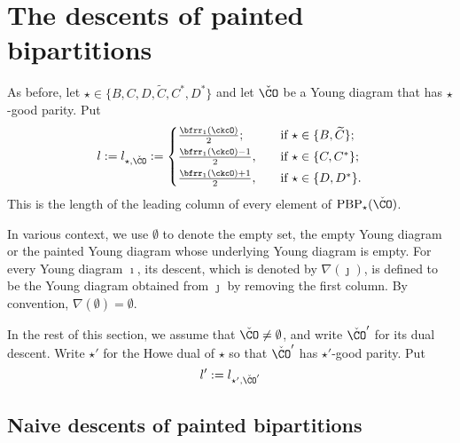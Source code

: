 \documentclass[ssunip]{subfiles}
\begin{document}
 \section{The descents of painted bipartitions}\label{sec:comb}

As before, let  $\star\in \{ B, C,  D, \widetilde{C},  C^*, D^*\}$ and let $\check \CO$ be a Young diagram that has $\star$-good parity. Put
\begin{equation}\label{lstarco}
  l:=l_{\star, \check \CO}:=\begin{cases}
 \frac{\bfrr_1(\ckcO)}{2}; & \quad \textrm{if } \star\in \{B, \widetilde C\};\smallskip\\
 \frac{\bfrr_1(\ckcO)-1}{2}, &\quad \textrm{if } \star\in \{C, C^* \};\smallskip\\
 \frac{\bfrr_1(\ckcO)+1}{2}, &\quad \textrm{if } \star\in \{ D, D^*\}.\\
\end{cases}
\end{equation}
This is the length of the leading column of every element of $\mathrm{PBP}_\star(\check \CO)$. 

 
 In various context, we use $\emptyset$ to denote the empty set, the empty Young diagram or the painted Young diagram whose underlying Young diagram is empty. For every Young diagram $\imath$, its descent, which is denoted by $\nabla(\jmath)$, is defined to be the Young diagram obtained from $\jmath$ by removing the first column. By convention, $\nabla(\emptyset)=\emptyset$. 
 
 In the rest of this section, we assume that $\check \CO\neq \emptyset$, and write $\check \CO'$ for its dual descent. Write $\star'$ for the Howe dual of $\star$ so that $\check \CO'$ has $\star'$-good parity. Put
\[
l':=l_{\star', \check \CO'}
\]
    
 \subsection{Naive descents of painted bipartitions }
\def\bipartl{\mathrm{bi\cP_L}}
\def\bipartr{\mathrm{bi\cP_R}}
\def\dsdiagl{\mathrm{DS_L}}
\def\dsdiagr{\mathrm{DS_R}}
\def\DDl{\eDD_\mathrm{L}}
\def\DDr{\eDD_\mathrm{R}}
\end{document}
